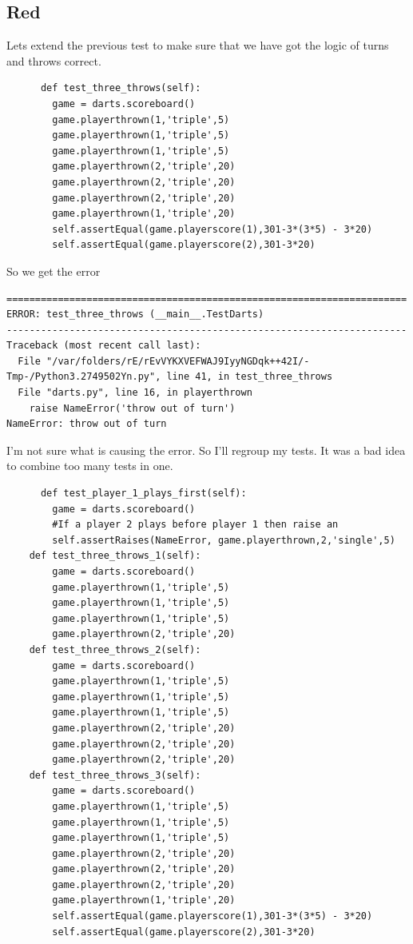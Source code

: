 \documentclass{paper}
\begin{document}
\subsection{Red}
Lets extend the previous test to make sure that we have got the logic
of turns and throws correct.
\begin{lstlisting}
      def test_three_throws(self):
        game = darts.scoreboard()
        game.playerthrown(1,'triple',5)
        game.playerthrown(1,'triple',5)
        game.playerthrown(1,'triple',5)
        game.playerthrown(2,'triple',20)
        game.playerthrown(2,'triple',20)
        game.playerthrown(2,'triple',20)
        game.playerthrown(1,'triple',20)
        self.assertEqual(game.playerscore(1),301-3*(3*5) - 3*20)
        self.assertEqual(game.playerscore(2),301-3*20)
\end{lstlisting}

So we get the error
\begin{verbatim}
======================================================================
ERROR: test_three_throws (__main__.TestDarts)
----------------------------------------------------------------------
Traceback (most recent call last):
  File "/var/folders/rE/rEvVYKXVEFWAJ9IyyNGDqk++42I/-Tmp-/Python3.2749502Yn.py", line 41, in test_three_throws
  File "darts.py", line 16, in playerthrown
    raise NameError('throw out of turn')
NameError: throw out of turn
\end{verbatim}

I'm not sure what is causing the error. So I'll regroup my
tests. It was a bad idea to combine too many tests in one.

\begin{lstlisting}
      def test_player_1_plays_first(self):
        game = darts.scoreboard()
        #If a player 2 plays before player 1 then raise an 
        self.assertRaises(NameError, game.playerthrown,2,'single',5)
    def test_three_throws_1(self):
        game = darts.scoreboard()
        game.playerthrown(1,'triple',5)
        game.playerthrown(1,'triple',5)
        game.playerthrown(1,'triple',5)
        game.playerthrown(2,'triple',20)
    def test_three_throws_2(self):
        game = darts.scoreboard()
        game.playerthrown(1,'triple',5)
        game.playerthrown(1,'triple',5)
        game.playerthrown(1,'triple',5)
        game.playerthrown(2,'triple',20)
        game.playerthrown(2,'triple',20)
        game.playerthrown(2,'triple',20)
    def test_three_throws_3(self):
        game = darts.scoreboard()
        game.playerthrown(1,'triple',5)
        game.playerthrown(1,'triple',5)
        game.playerthrown(1,'triple',5)
        game.playerthrown(2,'triple',20)
        game.playerthrown(2,'triple',20)
        game.playerthrown(2,'triple',20)
        game.playerthrown(1,'triple',20)
        self.assertEqual(game.playerscore(1),301-3*(3*5) - 3*20)
        self.assertEqual(game.playerscore(2),301-3*20)
\end{lstlisting}
\end{document}
